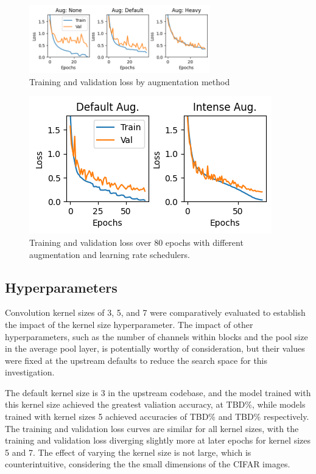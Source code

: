 \documentclass[letterpaper]{article} %
\begin{document}
\begin{figure}[t]
\centering
\includegraphics[width=0.70\textwidth]{experiment-aug1}
\caption{Training and validation loss by augmentation method}
\label{fig4}
\end{figure}

\begin{figure}[b]
\centering
\includegraphics[width=0.98\columnwidth]{experiment-80epoch-augtypes}
\caption{Training and validation loss over 80 epochs with different augmentation and learning rate schedulers.}
\label{fig5}
\end{figure}

\subsection{Hyperparameters}

Convolution kernel sizes of 3, 5, and 7 were comparatively evaluated to establish the impact of the
kernel size hyperparameter.
The impact of other hyperparameters, such as the number of channels within blocks and the pool size in the average pool
layer, is potentially worthy of consideration, but their values were fixed at the upstream defaults to reduce the
search space for this investigation.

The default kernel size is 3 in the upstream codebase, and the model trained with this kernel size achieved the
greatest valiation accuracy, at TBD\%, while models trained with kernel sizes 5 achieved accuracies
of TBD\% and TBD\% respectively.
The training and validation loss curves are similar for all kernel sizes, with the training and validation
loss diverging slightly more at later epochs for kernel sizes 5 and 7.
The effect of varying the kernel size is not large, which is counterintuitive, considering the
the small dimensions of the CIFAR images.
\end{document}
